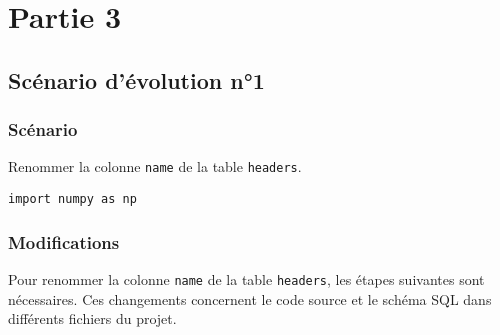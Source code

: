 \section{Partie 3}

\subsection{Scénario d'évolution n°1}
\subsubsection{Scénario}
Renommer la colonne \texttt{name} de la table \texttt{headers}.
\begin{verbatim}
import numpy as np
\end{verbatim}
\subsubsection{Modifications}
Pour renommer la colonne \texttt{name} de la table \texttt{headers}, les étapes suivantes sont nécessaires. Ces changements concernent le code source et le schéma SQL dans différents fichiers du projet.

